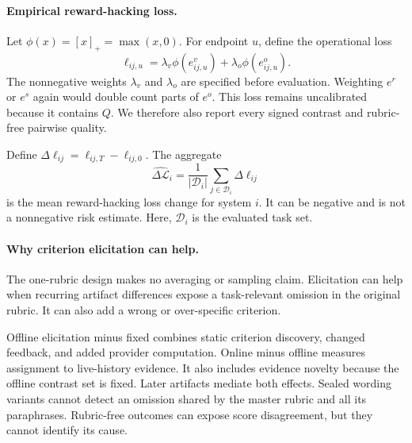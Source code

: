 \documentclass{article} %
\begin{document}
\paragraph{Empirical reward-hacking loss.}
Let $\phi(x)=[x]_+=\max(x,0)$. For endpoint $u$, define the operational loss
\begin{equation}
\boxed{
\ell_{ij,u}
=
\lambda_{v}\phi\!\left(e^{v}_{ij,u}\right)
+
\lambda_{o}\phi\!\left(e^{o}_{ij,u}\right)
}.
\end{equation}
The nonnegative weights $\lambda_v$ and $\lambda_o$ are specified before
evaluation. Weighting $e^r$ or $e^s$ again would double count parts of
$e^o$. This loss remains uncalibrated because it contains $Q$. We therefore
also report every signed contrast and rubric-free pairwise quality.

Define $\Delta\ell_{ij}=\ell_{ij,T}-\ell_{ij,0}$. The aggregate
\begin{equation}
\boxed{
\widehat{\Delta\mathcal{L}}_i
=
\frac{1}{|\mathcal{D}_i|}
\sum_{j\in\mathcal{D}_i}
\Delta \ell_{ij}
}
\end{equation}
is the mean reward-hacking loss change for system $i$. It can be negative and is
not a nonnegative risk estimate. Here, $\mathcal{D}_i$ is the evaluated task set.

\paragraph{Why criterion elicitation can help.}
The one-rubric design makes no averaging or sampling claim. Elicitation can help
when recurring artifact differences expose a task-relevant omission in the
original rubric. It can also add a wrong or over-specific criterion.

Offline elicitation minus fixed combines static criterion discovery, changed
feedback, and added provider computation. Online minus offline measures
assignment to live-history evidence. It also includes evidence novelty because
the offline contrast set is fixed. Later artifacts mediate both effects. Sealed
wording variants cannot detect an omission shared by the master rubric and all
its paraphrases. Rubric-free outcomes can expose score disagreement, but they
cannot identify its cause.
\end{document}
